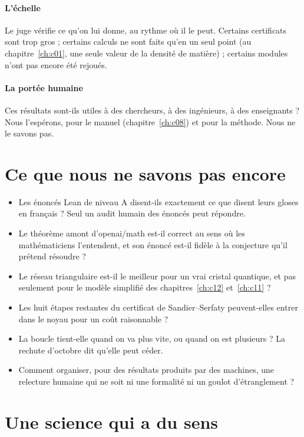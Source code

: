 \paragraph{L'échelle} Le juge vérifie ce qu'on lui donne, au rythme où il le peut. Certains certificats sont trop
gros ; certains calculs ne sont faits qu'en un seul point (au chapitre~\ref{ch:c01}, une seule valeur de la densité de
matière) ; certains modules n'ont pas encore été rejoués.

\paragraph{La portée humaine} Ces résultats sont-ils utiles à des chercheurs, à des ingénieurs, à des enseignants ?
Nous l'espérons, pour le manuel (chapitre~\ref{ch:c08}) et pour la méthode. Nous ne le savons pas.

\section{Ce que nous ne savons pas encore}

\begin{encadre}
\begin{itemize}
\item Les énoncés Lean de niveau A disent-ils exactement ce que disent leurs gloses en français ? Seul un audit humain
des énoncés peut répondre.
\item Le théorème amont d'openai/math est-il correct au sens où les mathématiciens l'entendent, et son énoncé est-il
fidèle à la conjecture qu'il prétend résoudre ?
\item Le réseau triangulaire est-il le meilleur pour un vrai cristal quantique, et pas seulement pour le modèle simplifié
des chapitres~\ref{ch:c12} et~\ref{ch:c11} ?
\item Les huit étapes restantes du certificat de Sandier--Serfaty peuvent-elles entrer dans le noyau pour un coût
raisonnable ?
\item La boucle tient-elle quand on va plus vite, ou quand on est plusieurs ? La rechute d'octobre dit qu'elle peut
céder.
\item Comment organiser, pour des résultats produits par des machines, une relecture humaine qui ne soit ni une
formalité ni un goulot d'étranglement ?
\end{itemize}
\end{encadre}

\section{Une science qui a du sens}

